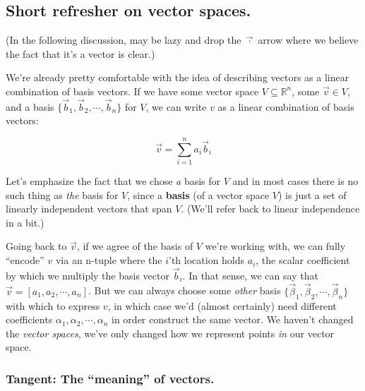 \documentclass[letterpaper,12pt]{report}
\begin{document}
\subsection{Short refresher on vector spaces.}

(In the following discussion,
may be lazy and drop the \(\vec{\cdot}\) arrow where we believe the fact
that it's a vector is clear.)

We're already pretty comfortable with the idea of describing vectors as a linear combination
of basis vectors. If we have some vector space \(V \subseteq \mathbb{R}^n\),
some \(\vec{v} \in V\),
and
a basis \(\{\vec{b}_1, \vec{b}_2, \cdots, \vec{b}_n\}\) for \(V\), we can write
\(v\) as a linear combination of basis vectors:

\[\vec{v} = \sum_{i=1}^{n} a_i\vec{b}_i \]



Let's emphasize the fact that we chose \emph{a} basis for \(V\)
and in most cases there is no such thing as \emph{the} basis for \(V\), since a
\textbf{basis} (of a vector space \(V\))
is just a set of linearly independent vectors that span \(V\).
(We'll refer back to linear independence in a bit.)\par

Going back to \(\vec{v}\), if we agree of the basis of \(V\) we're working with,
we can fully ``encode'' \(v\) via an n-tuple where the \(i\)'th location holds \(a_i\),
the scalar coefficient by which we multiply the basis vector \(\vec{b}_i\).
In that sense, we can say that \(\vec{v} = \left[a_1, a_2, \cdots, a_n\right]\).
But we can always choose some \emph{other} basis
\(\{\vec{\beta}_1, \vec{\beta}_2, \cdots, \vec{\beta}_n\}\)
with which to express \(v\), in which case we'd (almost certainly) need different coefficients
\(\alpha_1, \alpha_2, \cdots, \alpha_n\) in order construct the same vector.
We haven't changed the \emph{vector spaces}, we've only changed how we represent points
\emph{in} our vector space.\par

\subsubsection*{Tangent: The ``meaning'' of vectors.}
\end{document}
